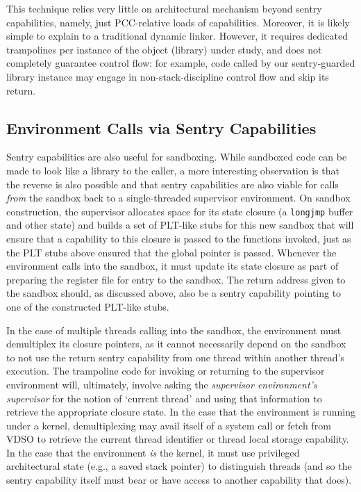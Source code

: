 This technique relies very little on architectural mechanism beyond sentry
capabilities, namely, just PCC-relative loads of capabilities.  Moreover, it is
likely simple to explain to a traditional dynamic linker.  However, it requires
dedicated trampolines per instance of the object (library) under study, and
does not completely guarantee control flow: for example, code called by our
sentry-guarded library instance may engage in non-stack-discipline control flow
and skip its return.

\subsection{Environment Calls via Sentry Capabilities}

Sentry capabilities are also useful for sandboxing.  While sandboxed code can
be made to look like a library to the caller, a more
interesting observation is that the reverse is also possible and that sentry
capabilities are also viable for calls \emph{from} the sandbox back to a
single-threaded supervisor environment.  On sandbox construction, the
supervisor allocates space for its state closure (a \texttt{longjmp} buffer
and other state) and builds a set of PLT-like stubs for this
new sandbox that will ensure that a capability to this closure is passed to
the functions invoked, just as the PLT stubs above ensured that the global
pointer is passed.  Whenever the environment calls into the sandbox, it must
update its state closure as part of preparing the register file for entry to
the sandbox.  The return address given to the sandbox should, as discussed
above, also be a sentry capability pointing to one of the constructed
PLT-like stubs.

In the case of multiple threads calling into the sandbox, the environment must
demultiplex its closure pointers, as it cannot necessarily depend on the
sandbox to not use the return sentry capability from one thread within another
thread's execution.  The trampoline code for invoking or returning to the
supervisor environment will, ultimately, involve asking the \emph{supervisor environment's
supervisor} for the notion of `current thread' and using that information to
retrieve the appropriate closure state.  In the case that the environment is
running under a kernel, demultiplexing may avail itself of a system call or
fetch from VDSO to retrieve the current thread identifier or thread local
storage capability.  In the case that the environment \emph{is} the kernel, it
must use privileged architectural state (e.g., a saved stack pointer) to
distinguish threads (and so the sentry capability itself must bear
\cappermASR or have access to another capability that does).

